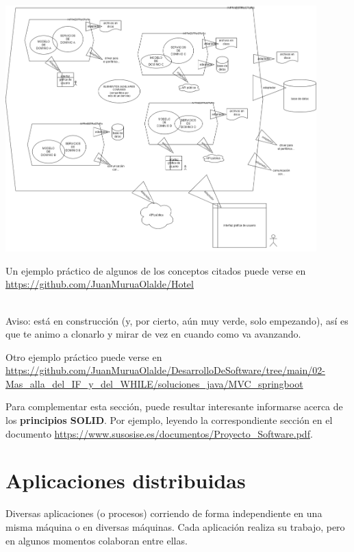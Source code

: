 \documentclass[spanish,12pt,a4paper,final,oneside]{book}
\begin{document}
\begin{center}\includegraphics[width=0.9\textwidth]{division en capas - DDD}\end{center}


\begin{footnotesize}
Un ejemplo práctico de algunos de los conceptos citados puede verse en
\\ \url{https://github.com/JuanMuruaOlalde/Hotel}
\end{footnotesize}
\begin{scriptsize}
\\Aviso: está en construcción (y, por cierto, aún muy verde, solo empezando), así es que te animo a clonarlo y mirar de vez en cuando como va avanzando.
\end{scriptsize}

\begin{footnotesize}
Otro ejemplo práctico puede verse en \\ \url{https://github.com/JuanMuruaOlalde/DesarrolloDeSoftware/tree/main/02-Mas_alla_del_IF_y_del_WHILE/soluciones_java/MVC_springboot}
\end{footnotesize}

\begin{footnotesize}
Para complementar esta sección, puede resultar interesante informarse acerca de los \textbf{principios SOLID}. Por ejemplo, leyendo la correspondiente sección en el documento \url{https://www.susosise.es/documentos/Proyecto_Software.pdf}.
\end{footnotesize}


\section{Aplicaciones distribuidas} \label{AplicacionesDistribuidas}
Diversas aplicaciones (o procesos) corriendo de forma independiente en una misma máquina o en diversas máquinas. Cada aplicación realiza su trabajo, pero en algunos momentos colaboran entre ellas.
\end{document}
